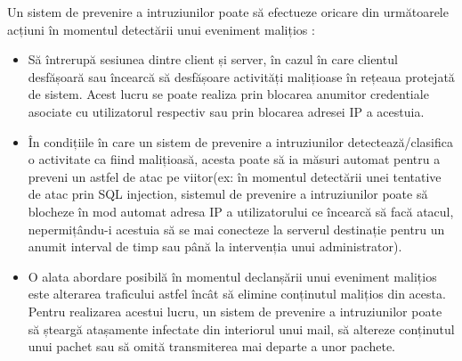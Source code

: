 Un sistem de prevenire a intruziunilor poate să efectueze oricare din următoarele acțiuni în momentul detectării unui eveniment malițios  \cite{ips_fire}:
\begin{itemize}
	\item  Să întrerupă sesiunea dintre client și server, în cazul în care clientul desfășoară sau încearcă să desfășoare activități malițioase în rețeaua protejată de sistem. Acest lucru se poate realiza prin blocarea anumitor credentiale asociate cu utilizatorul respectiv sau prin blocarea adresei IP a acestuia. 
	\item  În condițiile în care un sistem de prevenire a intruziunilor detectează/clasifica o activitate ca fiind malițioasă, acesta poate să ia măsuri automat pentru a preveni un astfel de atac pe viitor(ex: în momentul detectării unei tentative de atac prin SQL injection, sistemul de prevenire a intruziunilor poate să blocheze în mod automat adresa IP a utilizatorului ce încearcă să facă atacul, nepermițându-i acestuia să se mai conecteze la serverul destinație pentru un anumit interval de timp sau până la intervenția unui administrator). 
	\item  O alata abordare posibilă în momentul declanșării unui eveniment malițios este alterarea traficului astfel încât să elimine conținutul malițios din acesta. Pentru realizarea acestui lucru, un sistem de prevenire a intruziunilor poate să șteargă atașamente infectate din interiorul unui mail, să altereze conținutul unui pachet sau să omită transmiterea mai departe a unor pachete. 
	
\end{itemize}

